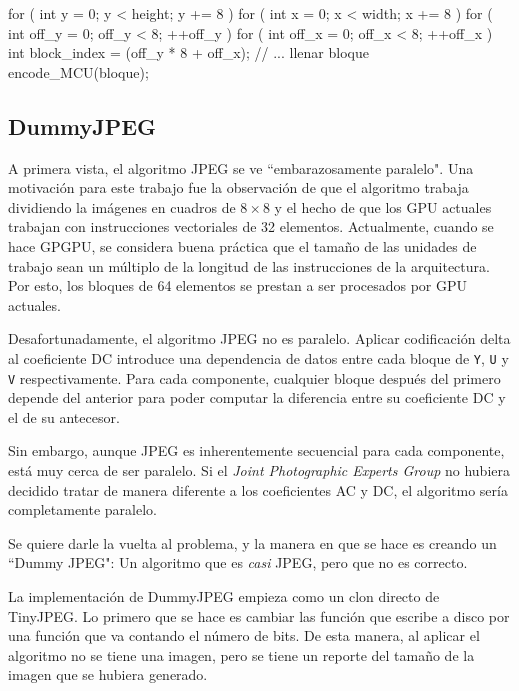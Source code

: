 \begin{code}[language=C][h]
    for ( int y = 0; y < height; y += 8 ) {
        for ( int x = 0; x < width; x += 8 ) {
            for ( int off_y = 0; off_y < 8; ++off_y ) {
                for ( int off_x = 0; off_x < 8; ++off_x ) {
                    int block_index = (off_y * 8 + off_x);
                    // ... llenar bloque
                }
            }
            encode_MCU(bloque);
        }
    }
\end{code}

\subsection{DummyJPEG} \label{sub:dummy}

A primera vista, el algoritmo JPEG se ve ``embarazosamente paralelo". Una
motivación para este trabajo fue la observación de que el algoritmo trabaja
dividiendo la imágenes en cuadros de $8\times8$ y el hecho de que los GPU
actuales trabajan con instrucciones vectoriales de 32 elementos. Actualmente,
cuando se hace \gls{GPGPU}, se considera buena práctica que el tamaño de las
unidades de trabajo sean un múltiplo de la longitud de las instrucciones de la
arquitectura. Por esto, los bloques de 64 elementos se prestan a ser procesados
por GPU actuales.

Desafortunadamente, el algoritmo JPEG no es paralelo. Aplicar codificación
delta al coeficiente DC introduce una dependencia de datos entre cada bloque de
\verb+Y+, \verb+U+ y \verb+V+ respectivamente. Para cada componente, cualquier
bloque después del primero depende del anterior para poder computar la
diferencia entre su coeficiente DC  y el de su antecesor.

Sin embargo, aunque JPEG es inherentemente secuencial para cada componente,
está muy cerca de ser paralelo. Si el \emph{Joint Photographic Experts Group}
no hubiera decidido tratar de manera diferente a los \gls{coeficientes AC} y DC, el
algoritmo sería completamente paralelo.

Se quiere darle la vuelta al problema, y la manera en que se hace es creando
un ``Dummy JPEG": Un algoritmo que es \emph{casi} JPEG, pero que no es correcto.

La implementación de DummyJPEG empieza como un clon directo de TinyJPEG. Lo
primero que se hace es cambiar las función que escribe a disco por una función
que va contando el número de bits. De esta manera, al aplicar el algoritmo no
se tiene una imagen, pero se tiene un reporte del tamaño de la imagen que
se hubiera generado.

